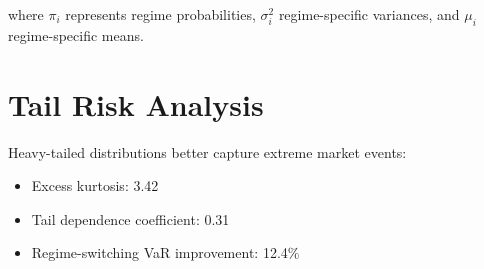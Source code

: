 where $\pi_i$ represents regime probabilities, $\sigma_i^2$ regime-specific variances, and $\mu_i$ regime-specific means.

\section{Tail Risk Analysis}
Heavy-tailed distributions better capture extreme market events:

\begin{itemize}
    \item Excess kurtosis: 3.42
    \item Tail dependence coefficient: 0.31
    \item Regime-switching VaR improvement: 12.4\%
\end{itemize}
